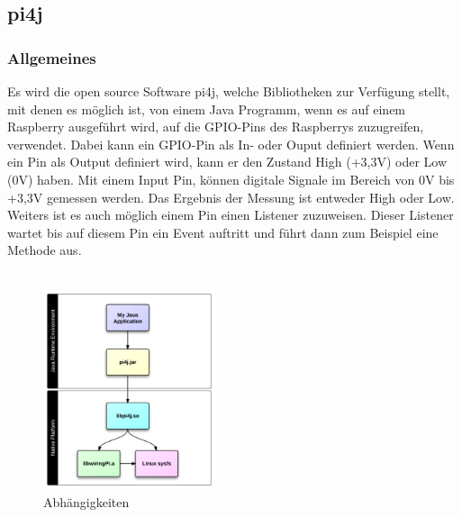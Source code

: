 \subsection{pi4j} \label{subsec:pi4j}
\subsubsection{Allgemeines}
Es wird die open source Software \ac{pi4j}, welche Bibliotheken zur Verfügung stellt, mit denen es möglich ist, von einem Java Programm, wenn es auf einem Raspberry ausgeführt wird, auf die \ac{GPIO}-Pins des Raspberrys zuzugreifen, verwendet. Dabei kann ein \ac{GPIO}-Pin als In- oder Ouput definiert werden. Wenn ein Pin als Output definiert wird, kann er den Zustand High (+3,3V) oder Low (0V) haben. Mit einem Input Pin, können digitale Signale im Bereich von 0V bis +3,3V gemessen werden. Das Ergebnis der Messung ist entweder High oder Low. Weiters ist es auch möglich einem Pin einen Listener zuzuweisen. Dieser Listener wartet bis auf diesem Pin ein Event auftritt und führt dann zum Beispiel eine Methode aus. 
\\ \\

\begin{figure}
\vspace{-35pt}
  \begin{center}
    \includegraphics[width=0.45\textwidth]{Bilder/pi4j/dependencies}
  \end{center}
  \caption[Abhängigkeiten]{Abhängigkeiten\protect\footnotemark}
  \label{Abhaengigkeiten}
  \vspace{-160pt}
\end{figure}


